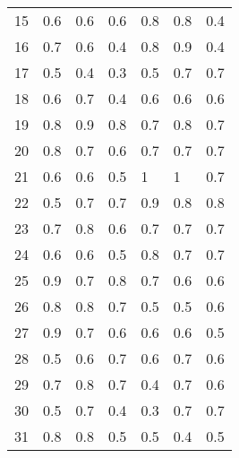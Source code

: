 \begin{table}[]
\begin{tabular}{l|lll|lll}
15              & 0.6                  & 0.6       & 0.6     & 0.8     & 0.8 & 0.4     \\
16              & 0.7                  & 0.6       & 0.4     & 0.8     & 0.9 & 0.4     \\
17              & 0.5                  & 0.4       & 0.3     & 0.5     & 0.7 & 0.7     \\
18              & 0.6                  & 0.7       & 0.4     & 0.6     & 0.6 & 0.6     \\
19              & 0.8                  & 0.9       & 0.8     & 0.7     & 0.8 & 0.7     \\
20              & 0.8                  & 0.7       & 0.6     & 0.7     & 0.7 & 0.7     \\
21              & 0.6                  & 0.6       & 0.5     & 1       & 1   & 0.7     \\
22              & 0.5                  & 0.7       & 0.7     & 0.9     & 0.8 & 0.8     \\
23              & 0.7                  & 0.8       & 0.6     & 0.7     & 0.7 & 0.7     \\
24              & 0.6                  & 0.6       & 0.5     & 0.8     & 0.7 & 0.7     \\
25              & 0.9                  & 0.7       & 0.8     & 0.7     & 0.6 & 0.6     \\
26              & 0.8                  & 0.8       & 0.7     & 0.5     & 0.5 & 0.6     \\
27              & 0.9                  & 0.7       & 0.6     & 0.6     & 0.6 & 0.5     \\
28              & 0.5                  & 0.6       & 0.7     & 0.6     & 0.7 & 0.6     \\
29              & 0.7                  & 0.8       & 0.7     & 0.4     & 0.7 & 0.6     \\
30              & 0.5                  & 0.7       & 0.4     & 0.3     & 0.7 & 0.7     \\
31              & 0.8                  & 0.8       & 0.5     & 0.5     & 0.4 & 0.5     \\
\end{tabular}
\end{table}
\clearpage
